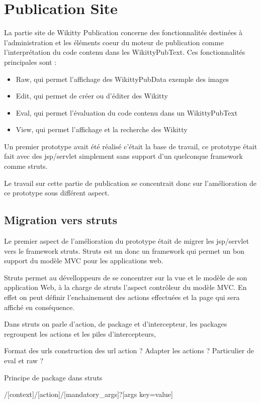 \section{Publication Site}

La partie site de Wikitty Publication concerne des fonctionnalités
destinées à l'administration et les éléments coeur du moteur de publication
comme l'interprétation du code contenu dans les WikittyPubText. Ces
fonctionnalités principales sont :
\begin{itemize}
\item Raw, qui permet l'affichage des WikittyPubData exemple des images
\item Edit, qui permet de créer ou d'éditer des Wikitty
\item Eval, qui permet l'évaluation du code contenu dans un WikittyPubText
\item View, qui permet l'affichage et la recherche des Wikitty
\end{itemize}

Un premier prototype avait été réalisé c'était la base de travail, ce prototype
était fait avec des jsp/servlet simplement sans support d'un quelconque
framework comme struts.

Le travail sur cette partie de publication se concentrait donc sur
l'amélioration de ce prototype sous différent aspect.


\subsection{Migration vers struts}

Le premier aspect de l'amélioration du prototype était de migrer les jsp/servlet
vers le framework struts. Struts est un donc un framework qui permet un bon
support du modèle MVC pour les applications web.

Struts permet au dévelloppeurs de se concentrer sur la vue et le modèle de son
application Web, à la charge de struts l'aspect contrôleur du modèle MVC. En
effet on peut définir l'enchainement des actions effectuées et la page qui sera
affiché en conséquence.

Dans struts on parle d'action, de package et d'intercepteur, les packages
regroupent les actions et les piles d'intercepteurs, 

Format des urls 
construction des url
action ?
Adapter les actions ?
Particulier de eval et raw ?


Principe de package dans struts


  /[context]/[action]/[mandatory_args]?[args key=value]
  
